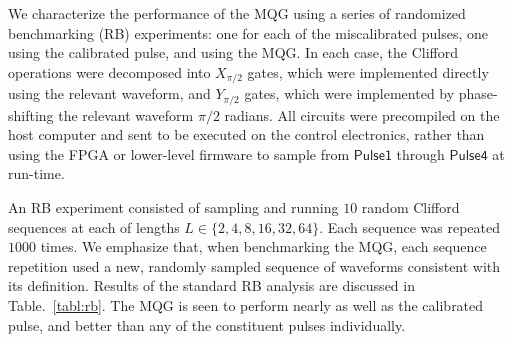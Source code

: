 \documentclass[aps,nofootinbib,pra,notitlepage,twocolumn]{revtex4-1}
\newcommand{\0}{\ensuremath{\mathbf{0}}}
\begin{document}
We characterize the performance of the MQG using a series of randomized benchmarking (RB) experiments\cite{Magesan2011}: one for each of the miscalibrated pulses, one using the calibrated pulse, and using the MQG. In each case, the Clifford operations were decomposed into $X_{\pi/2}$ gates, which were implemented directly using the relevant waveform, and $Y_{\pi/2}$ gates, which were implemented by phase-shifting the relevant waveform $\pi/2$ radians. All circuits were precompiled on the host computer and sent to be executed on the control electronics, rather than using the FPGA or lower-level firmware to sample from $\mathsf{Pulse1}$ through $\mathsf{Pulse4}$ at run-time.

An RB experiment consisted of sampling and running $10$ random Clifford sequences at each of lengths $L\in\{2, 4, 8, 16, 32, 64\}$. Each sequence was repeated $1000$ times. We emphasize that, when benchmarking the MQG, each sequence repetition used a new, randomly sampled sequence of waveforms consistent with its definition. Results of the standard RB analysis are discussed in Table.~\ref{tabl:rb}. The MQG is seen to perform nearly as well as the calibrated pulse, and better than any of the constituent pulses individually.  
\end{document}
